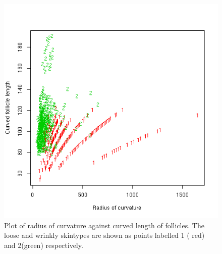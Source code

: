 %

\begin{figure}[!h]
  \centering
  \includegraphics[width=1.0\textwidth]{radcurvxcurvlen.png}
  \caption{Plot of  radius of curvature against curved length of follicles. The loose and wrinkly skintypes are shown as points labelled 1 ( red) and 2(green) respectively.}
  \label{fig:radcurvxcurvlen}
\end{figure}

%

